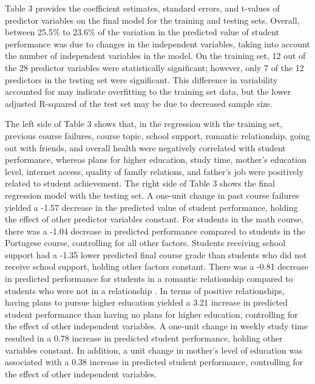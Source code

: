 \documentclass[sigconf]{acmart}
\begin{document}
Table 3 provides the coefficient estimates, standard errors, and t-values of 
predictor variables on the final model for the training and testing sets.
Overall, between 25.5\% to 23.6\% of the variation in the predicted value of 
student performance was due to changes in the independent variables, taking 
into account the number of independent variables in the model. On the training 
set, 12 out of the 28 predictor variables were statistically significant; 
however, only 7 of the 12 predictors in the testing set were significant. 
This difference in variability accounted for may indicate overfitting to the 
training set data, but the lower adjusted R-squared of the test set may be 
due to decreased sample size. 


The left side of Table 3 shows that, in the regression with the training set, 
previous course failures, course topic, school support, romantic relationship, 
going out with friends, and overall health were negatively correlated with 
student performance, whereas plans for higher education, study time, mother's
education level, internet access, quality of family relations, and father's 
job were positively related to student achievement. The right side of Table 3
shows the final regression model with the testing set. A one-unit change in 
past course failures yielded a -1.57 decrease in the predicted value of 
student performance, holding the effect of other predictor variables constant. 
For students in the math course, there was a -1.04 decrease in predicted 
performance compared to students in the Portugese course, controlling for all 
other factors. Students receiving school support had a -1.35 lower predicted 
final course grade than students who did not receive school support, holding
other factors constant. There was a -0.81 decrease in predicted performance 
for students in a romantic relationship compared to students who were not in 
a relationship . In terms of positive relationships, having plans to pursue 
higher education yielded a 3.21 increase in predicted student performance 
than having no plans for higher education, controlling for the effect of other
independent variables. A one-unit change in weekly study time resulted in a 
0.78 increase in predicted student performance, holding other variables 
constant. In addition, a unit change in mother's level of education was 
associated with a 0.38 increase in predicted student performance, controlling 
for the effect of other independent variables. 
\end{document}
